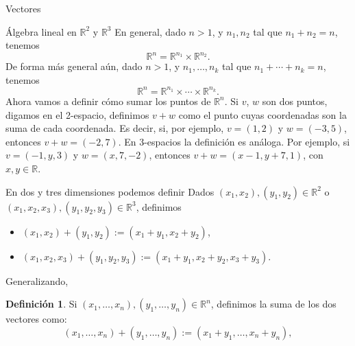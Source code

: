\documentclass[a4paper,12pt,twoside,spanish,reqno]{amsbook}
\numberwithin{equation}{section}
\theoremstyle{definition}
\newtheorem{definicion}[teorema]{Definici\'on}
\theoremstyle{remark}
\newcommand{\R}{\mathbb R}
\begin{document}
\begin{chapter}{Vectores}
\begin{section}{Álgebra lineal en $\R^2$ y $\R^3$}
        En  general, dado $n>1$, y $n_1,n_2$ tal que $n_1+n_2 = n$, tenemos
        \begin{equation*}
        \R^n= \R^{n_1} \times \R^{n_2}.
        \end{equation*} 
        De forma más general aún,  dado $n>1$, y $n_1,\ldots,n_k$ tal que $n_1+\cdots+n_k = n$, tenemos
        \begin{equation*}
        \R^n= \R^{n_1} \times \cdots\times \R^{n_k}.
        \end{equation*} 	
        Ahora vamos a definir cómo sumar los puntos de $\R^n$. Si $v$, $w$ son dos puntos, digamos en el 2-espacio,  definimos $v + w$ como el punto cuyas coordenadas son la suma de cada coordenada. Es decir, si, por ejemplo,  $v= (1, 2)$ y $w= (- 3, 5)$, entonces $v+w = (- 2, 7)$. En 3-espacios la definición es análoga. Por  ejemplo, si $v= (- 1, y, 3)$ y $w= (x, 7, - 2)$, entonces $v+w = (x - 1, y + 7, 1)$, con $x,y \in \R$.
        
        En  dos y tres dimensiones podemos definir
            Dados $(x_1,x_2), (y_1,y_2) \in \R^2$ o $(x_1,x_2,x_3), (y_1,y_2,y_3) \in \R^3$, definimos
        \begin{itemize}
            \item $(x_1,x_2)+ (y_1,y_2):=(x_1+y_1,x_2+y_2)$, 
            \item $(x_1,x_2,x_3)+ (y_1,y_2,y_3):=(x_1+y_1,x_2+y_2,x_3+y_3)$.
        \end{itemize}
        
        Generalizando, 
            \begin{definicion}
            Si $(x_1,\ldots,x_n), (y_1,\ldots,y_n) \in \R^n$, definimos la suma de los dos vectores como: 
                    \begin{equation*}
                    (x_1,\ldots,x_n)+ (y_1,\ldots,y_n):=(x_1+y_1,\ldots,x_n+y_n), 
                \end{equation*}
            \end{definicion}
            

\end{section}
\end{chapter}
\end{document}
